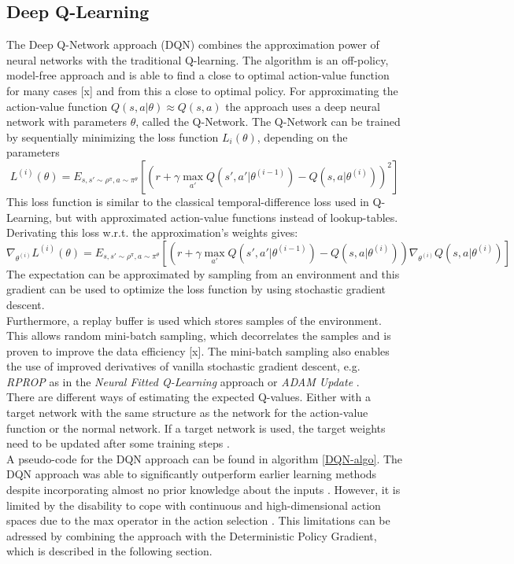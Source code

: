 \subsection{Deep Q-Learning}
\nocite{mnih2015human}
\label{sec:DQN}
The Deep Q-Network approach (DQN) \citep{mnih2013playing} combines the approximation power of neural networks with the traditional Q-learning. The algorithm is an off-policy, model-free approach and is able to find a close to optimal action-value function for many cases [x] and from this a close to optimal policy. For approximating the action-value function $Q(s,a|\theta)\approx Q(s,a)$ the approach uses a deep neural network with parameters $\theta$, called the Q-Network.
The Q-Network can be trained by sequentially minimizing the loss function $L_i(\theta)$, depending on the parameters
\[
L^{(i)}(\theta)=E_{s,s'\sim\rho^\pi,a\sim\pi^\theta}
\left[\left(r+\gamma \max_{a'} Q(s', 
a'|\theta^{(i-1)})-Q(s,a|\theta^{(i)})\right)^2\right] 
\]
This loss function is similar to the classical temporal-difference loss used in Q-Learning, but with approximated action-value functions instead of lookup-tables. Derivating this loss w.r.t. the approximation's weights gives:
\[
\nabla_{\theta^{(i)}}L^{(i)}(\theta)=E_{s,s'\sim\rho^\pi,a\sim\pi^\theta}
\left[\left(r+\gamma \max_{a'} Q(s', 
a'|\theta^{(i-1)})-Q(s,a|\theta^{(i)})\right)\nabla_{\theta^{(i)}}Q(s,a|\theta^{(i)})\right] 
\]
The expectation can be approximated by sampling from an environment and this gradient can be used to optimize the loss function by using stochastic gradient descent.\\
Furthermore, a replay buffer is used which stores samples of the environment. This allows random mini-batch sampling, which decorrelates the samples and is proven to improve the data efficiency [x]. The mini-batch sampling also enables the use of improved derivatives of vanilla stochastic gradient descent, e.g. \textit{RPROP} as in the \textit{Neural Fitted Q-Learning} approach \citep{riedmiller2005neural} or \textit{ADAM Update} \citep{kingma2014adam}.\\
There are different ways of estimating the expected Q-values. Either with a target network with the same structure as the network for the action-value function or the normal network. If a target network is used, the target weights need to be updated after some training steps \citep{mnih2015human}.\\
A pseudo-code for the DQN approach can be found in algorithm \ref{DQN-algo}.
The DQN approach was able to significantly outperform earlier learning methods despite incorporating almost no prior knowledge about the inputs \citep{mnih2013playing}. However, it is limited by the disability to cope with continuous and high-dimensional action spaces due to the max operator in the action selection \citep{lillicrap2015continuous}. This limitations can be adressed by combining the approach with the Deterministic Policy Gradient, which is described in the following section.


